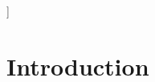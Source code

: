 \documentclass{article}
\begin{document}
\begin{abstract}




\end{abstract}
]



\printAffiliationsAndNotice{}  %

\section{Introduction}
\end{document}
